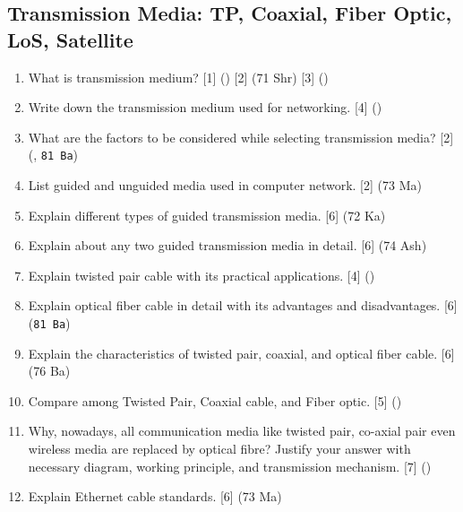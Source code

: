 \documentclass[12pt]{article}
\begin{document}
	\subsection{Transmission Media: TP, Coaxial, Fiber Optic, LoS, Satellite}
		\begin{enumerate}[noitemsep, topsep=0pt]
    		\item What is transmission medium? \hfill [1] () [2] (71 Shr) [3] ()
    
    		\item Write down the transmission medium used for networking. \hfill [4] ()
    
    		\item What are the factors to be considered while selecting transmission media? \hfill [2] (, \texttt{81 Ba})
    
    		\item List guided and unguided media used in computer network. \hfill [2] (73 Ma)

			\item Explain different types of guided transmission media. \hfill [6] (72 Ka)
    
    		\item Explain about any two guided transmission media in detail. \hfill [6] (74 Ash)
    
    		\item Explain twisted pair cable with its practical applications. \hfill [4] ()
    
    		\item Explain optical fiber cable in detail with its advantages and disadvantages. \hfill [6] (\texttt{81 Ba})
    
    		\item Explain the characteristics of twisted pair, coaxial, and optical fiber cable. \hfill [6] (76 Ba)
    
    		\item Compare among Twisted Pair, Coaxial cable, and Fiber optic. \hfill [5] ()
    
    		\item Why, nowadays, all communication media like twisted pair, co-axial pair even wireless media are replaced by optical fibre? Justify your answer with necessary diagram, working principle, and transmission mechanism. \hfill [7] ()
    
    		\item Explain Ethernet cable standards. \hfill [6] (73 Ma)
    

\end{enumerate}
\end{document}
